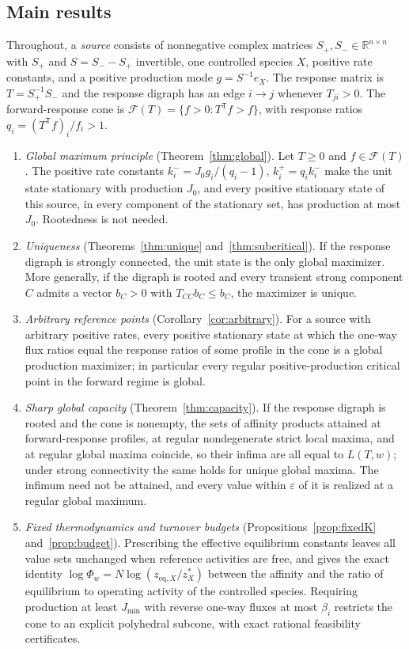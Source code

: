 \documentclass[11pt,a4paper]{article}
\theoremstyle{plain}
\theoremstyle{definition}
\theoremstyle{remark}
\numberwithin{equation}{section}
\newcommand{\R}{\mathbb{R}}
\newcommand{\T}{\mathsf{T}}
\newcommand{\Sp}{S_{+}}
\newcommand{\Sm}{S_{-}}
\newcommand{\cone}{\mathcal{F}}
\newcommand{\eps}{\varepsilon}
\newcommand{\Jmin}{J_{\min}}
\begin{document}
\subsection{Main results}
Throughout, a \emph{source} consists of nonnegative complex matrices $\Sp,\Sm\in\R^{n\times n}$ with $\Sp$ and $S=\Sm-\Sp$ invertible, one controlled species $X$, positive rate constants, and a positive production mode $g=S^{-1}e_X$. The response matrix is $T=\Sp^{-1}\Sm$ and the response digraph has an edge $i\to j$ whenever $T_{ji}>0$. The forward-response cone is $\cone(T)=\{f>0:T^{\T}f>f\}$, with response ratios $q_i=(T^{\T}f)_i/f_i>1$.

\begin{enumerate}[label=(\Alph*)]
\item \emph{Global maximum principle} (Theorem~\ref{thm:global}). Let $T\ge0$ and $f\in\cone(T)$. The positive rate constants $k^-_i=J_0g_i/(q_i-1)$, $k^+_i=q_ik^-_i$ make the unit state stationary with production $J_0$, and every positive stationary state of this source, in every component of the stationary set, has production at most $J_0$. Rootedness is not needed.
\item \emph{Uniqueness} (Theorems~\ref{thm:unique} and~\ref{thm:subcritical}). If the response digraph is strongly connected, the unit state is the only global maximizer. More generally, if the digraph is rooted and every transient strong component $C$ admits a vector $b_C>0$ with $T_{CC}b_C\le b_C$, the maximizer is unique.
\item \emph{Arbitrary reference points} (Corollary~\ref{cor:arbitrary}). For a source with arbitrary positive rates, every positive stationary state at which the one-way flux ratios equal the response ratios of some profile in the cone is a global production maximizer; in particular every regular positive-production critical point in the forward regime is global.
\item \emph{Sharp global capacity} (Theorem~\ref{thm:capacity}). If the response digraph is rooted and the cone is nonempty, the sets of affinity products attained at forward-response profiles, at regular nondegenerate strict local maxima, and at regular global maxima coincide, so their infima are all equal to $L(T,w)$; under strong connectivity the same holds for unique global maxima. The infimum need not be attained, and every value within $\eps$ of it is realized at a regular global maximum.
\item \emph{Fixed thermodynamics and turnover budgets} (Propositions~\ref{prop:fixedK} and~\ref{prop:budget}). Prescribing the effective equilibrium constants leaves all value sets unchanged when reference activities are free, and gives the exact identity $\log\Phi_w=N\log(z_{\mathrm{eq},X}/z^*_X)$ between the affinity and the ratio of equilibrium to operating activity of the controlled species. Requiring production at least $\Jmin$ with reverse one-way fluxes at most $\beta_i$ restricts the cone to an explicit polyhedral subcone, with exact rational feasibility certificates.

\end{enumerate}
\end{document}
